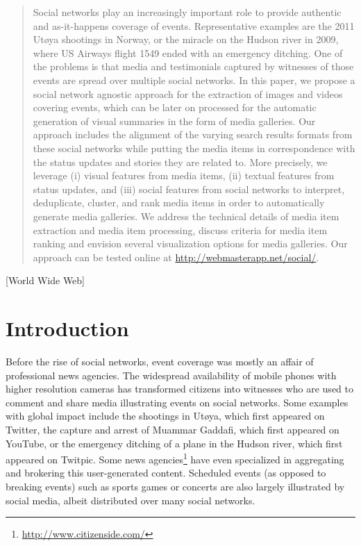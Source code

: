\documentclass{acm_proc_article-sp}
\newcommand{\inlinelistingsize}{\fontsize{8pt}{11pt}}
\let\oldurl\url
\renewcommand{\url}[1]{\inlinelistingsize\oldurl{#1}}
\begin{document}
\begin{abstract}
Social networks play an increasingly important role to provide authentic and as-it-happens coverage of events.
Representative examples are the 2011 Ut{\o}ya shootings in Norway, or the miracle on the Hudson river in 2009,
where US Airways flight 1549 ended with an emergency ditching. One of the problems is that media and testimonials
captured by witnesses of those events are spread over multiple social networks. In this paper, we propose a social network
agnostic approach for the extraction of images and videos covering events, which can be later on processed for the
automatic generation of visual summaries in the form of media galleries. Our approach includes the alignment of the
varying search results formats from these social networks while putting the media items in correspondence with the
status updates and stories they are related to. More precisely, we leverage (i) visual features from media items,
(ii) textual features from status updates, and (iii) social features from social networks to interpret, deduplicate,
cluster, and rank media items in order to automatically generate media galleries. We address the technical details of media
item extraction and media item processing, discuss criteria for media item ranking and envision several visualization options
for media galleries. Our approach can be tested online at \url{http://webmasterapp.net/social/}.
\end{abstract}

[World Wide Web]



\section{Introduction}                                                      \label{sec:introduction}
Before the rise of social networks, event coverage was mostly an affair of professional news agencies.
The widespread availability of mobile phones with higher resolution cameras has transformed citizens into witnesses
who are used to comment and share media illustrating events on social networks. Some examples with global impact
include the shootings in Ut{\o}ya, which first appeared on Twitter, the capture and arrest of Muammar Gaddafi, which
first appeared on YouTube, or the emergency ditching of a plane in the Hudson river, which first appeared on Twitpic.
Some news agencies\footnote{\url{http://www.citizenside.com/}} have even specialized in aggregating and brokering
this user-generated content. Scheduled events (as opposed to breaking events) such as sports games or concerts are also
largely illustrated by social media, albeit distributed over many social networks.
\end{document}
